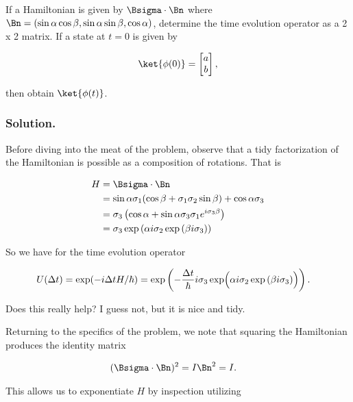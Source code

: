 If a Hamiltonian is given by $\Bsigma \cdot \Bn$ where $\Bn = (\sin\alpha\cos\beta, \sin\alpha\sin\beta, \cos\alpha)$, determine the time evolution operator as a 2 x 2 matrix.  If a state at $t = 0$ is given by 

\begin{align}\label{eqn:desaiCh5:600}
\ket{\phi(0)} = 
\begin{bmatrix}
a \\
b
\end{bmatrix},
\end{align}

then obtain $\ket{\phi(t)}$.

\subsubsection{Solution.}

Before diving into the meat of the problem, observe that a tidy factorization of the Hamiltonian is possible as a composition of rotations.  That is

\begin{align*}
H 
&= \Bsigma \cdot \Bn \\
&= \sin\alpha \sigma_1 ( \cos\beta + \sigma_1 \sigma_2 \sin\beta ) + \cos\alpha \sigma_3 \\
&= \sigma_3 \left(
\cos\alpha 
+ \sin\alpha \sigma_3 \sigma_1 e^{ i \sigma_3 \beta }
\right) \\
&= 
\sigma_3 \exp\left( \alpha i \sigma_2 
\exp\left( \beta i \sigma_3 
\right)
\right)
\end{align*}

So we have for the time evolution operator

\begin{align}\label{eqn:desaiCh5:610}
U(\Delta t) 
&=
\exp( -i \Delta t H /\hbar )
= 
\exp \left(
- \frac{\Delta t}{\hbar} i \sigma_3 \exp\Bigl( \alpha i \sigma_2 
\exp\left( \beta i \sigma_3 
\right)
\Bigr)
\right).
\end{align}

Does this really help?  I guess not, but it is nice and tidy.

Returning to the specifics of the problem, we note that squaring the Hamiltonian produces the identity matrix

\begin{align}\label{eqn:desaiCh5:615}
(\Bsigma \cdot \Bn)^2 &= I \Bn^2 = I.
\end{align}

This allows us to exponentiate $H$ by inspection utilizing

